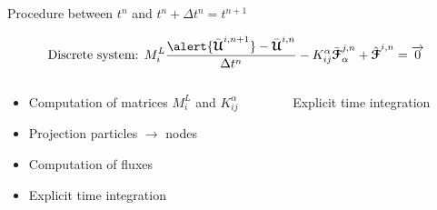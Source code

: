 \begin{frame}{Procedure between $t^n$ and $t^n + \Delta t^n=t^{n+1}$}
  \begin{footnotesize}
    \begin{equation*}
      \text{Discrete system: }M^L_{i} \frac{\alert{\bar{\Ucb}^{i,n+1}} - \bar{\Ucb}^{i,n}}{\Delta t^n}  - K_{ij}^\alpha \bar{\Fcb}^{j,n}_{\alpha}  + \hat{\Fcb}^{i,n}=  \vect{0}
    \end{equation*}
    \begin{columns}
      \begin{column}{0.4\textwidth}
        \begin{itemize}
        \item[(1)] Computation of matrices $M_i^L$ and $K_{ij}^\alpha$
        \item[(2)] Projection particles $\rightarrow$ nodes
        \item[(3)] Computation of fluxes
        \item[(4)] Explicit time integration
        \end{itemize}
      \end{column}
      \vrule{}
      \begin{column}{0.6\textwidth}
        \begin{block}{Explicit time integration}
          
                
        \end{block}
      \end{column}
    \end{columns}
  \end{footnotesize}
\end{frame}

